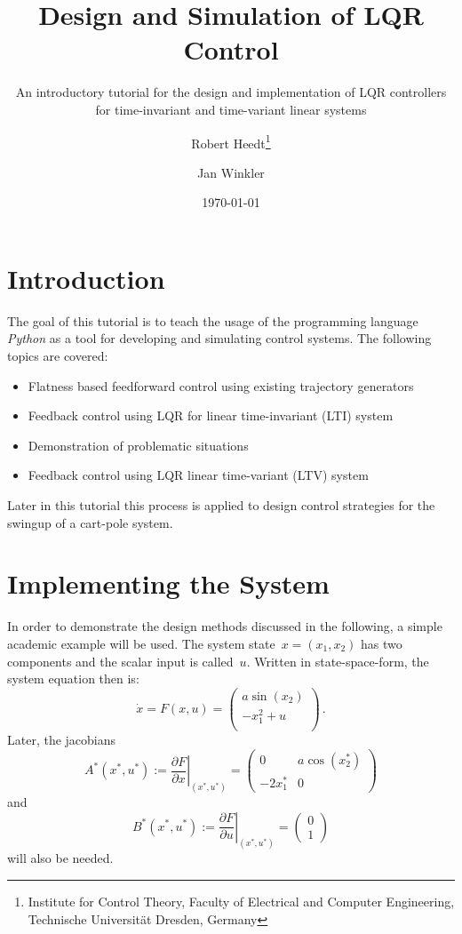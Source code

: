\documentclass[a4paper,11pt,headinclude=true,headsepline,parskip=half,DIV=13]{scrartcl}
\title{Design and Simulation of LQR Control}
\subtitle{An introductory tutorial for the design and implementation of LQR controllers for time-invariant and time-variant linear systems}
\author{Robert Heedt\thanks{Institute for Control Theory, Faculty of Electrical and Computer Engineering, Technische Universität Dresden, Germany} \and Jan Winkler\footnotemark[1]}
\date{\today}
\newcommand{\py}{\emph{Python}\xspace}
\begin{document}
\maketitle

\tableofcontents

\newpage

\section{Introduction}
The goal of this tutorial is to teach the usage of the programming language \py as a tool for developing and simulating control systems.
The following topics are covered:
\begin{itemize}
    \item Flatness based feedforward control using existing trajectory generators
    \item Feedback control using LQR for linear time-invariant (LTI) system
    \item Demonstration of problematic situations
    \item Feedback control using LQR linear time-variant (LTV) system
\end{itemize}
Later in this tutorial this process is applied to design control strategies for the swingup of a cart-pole system.

\section{Implementing the System}
In order to demonstrate the design methods discussed in the following, a simple academic example\autocite{ludyk} will be used.
The system state~$x=(x_1, x_2)$ has two components and the scalar input is called~$u$.
Written in state-space-form, the system equation then is:
\begin{equation}
\dot x = F(x, u) = 
\begin{pmatrix}
a \sin(x_2)\\
-x_1^2+u\\
\end{pmatrix}\,.
\label{eq:academic_example_ss}
\end{equation}
Later, the jacobians
\begin{equation}
A^*(x^*, u^*) := \left.\frac{\partial F}{\partial x}\right\vert_{(x^*, u^*)}= \begin{pmatrix}0 & a \cos(x^*_2)\\-2 x^*_1 & 0\end{pmatrix}
\label{eq:jac_A}
\end{equation}
and
\begin{equation}
B^*(x^*, u^*) := \left.\frac{\partial F}{\partial u}\right\vert_{(x^*, u^*)}= \begin{pmatrix}0 \\ 1\end{pmatrix}
\label{eq:jac_B}
\end{equation}
will also be needed.
\end{document}
